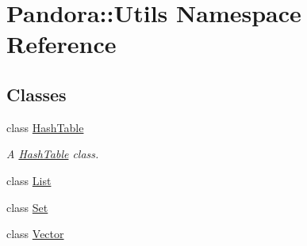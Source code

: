 \hypertarget{namespacePandora_1_1Utils}{
\section{Pandora::Utils Namespace Reference}
\label{namespacePandora_1_1Utils}
}
\subsection*{Classes}
\begin{DoxyCompactItemize}
\item 
class \hyperlink{classPandora_1_1Utils_1_1HashTable}{HashTable}
\begin{DoxyCompactList}\small\item\em A \hyperlink{classPandora_1_1Utils_1_1HashTable}{HashTable} class. \item\end{DoxyCompactList}\item 
class \hyperlink{classPandora_1_1Utils_1_1List}{List}
\item 
class \hyperlink{classPandora_1_1Utils_1_1Set}{Set}
\item 
class \hyperlink{classPandora_1_1Utils_1_1Vector}{Vector}
\end{DoxyCompactItemize}
